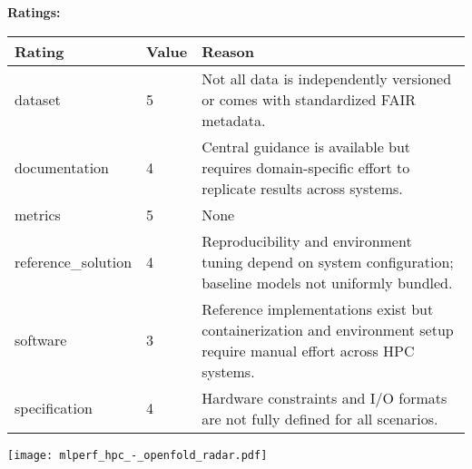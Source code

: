 {{{\bf Ratings:} ~ \\

\begin{tabular}{p{} p{} p{}}
\hline
Rating & Value & Reason \\
\hline
dataset & 5 & Not all data is independently versioned or comes with standardized FAIR metadata.
 \\
documentation & 4 & Central guidance is available but requires domain-specific effort to replicate results across systems.
 \\
metrics & 5 & None
 \\
reference\_solution & 4 & Reproducibility and environment tuning depend on system configuration; baseline models not uniformly bundled.
 \\
software & 3 & Reference implementations exist but containerization and environment setup require manual effort across HPC systems.
 \\
specification & 4 & Hardware constraints and I/O formats are not fully defined for all scenarios.
 \\
\hline
\end{tabular}

\texttt{[image: mlperf\_hpc\_-\_openfold\_radar.pdf]}
}}
\clearpage
